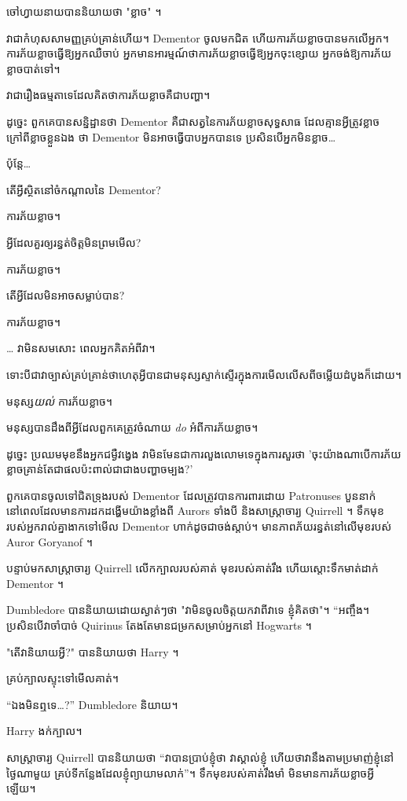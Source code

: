 {ចៅហ្វាយនាយបាននិយាយថា "ខ្លាច" ។

វាជាកំហុសសាមញ្ញគ្រប់គ្រាន់ហើយ។ Dementor ចូលមកជិត ហើយការភ័យខ្លាចបានមកលើអ្នក។ ការភ័យខ្លាចធ្វើឱ្យអ្នកឈឺចាប់ អ្នកមានអារម្មណ៍ថាការភ័យខ្លាចធ្វើឱ្យអ្នកចុះខ្សោយ អ្នកចង់ឱ្យការភ័យខ្លាចបាត់ទៅ។

វាជារឿងធម្មតាទេដែលគិតថាការភ័យខ្លាចគឺជាបញ្ហា។

ដូច្នេះ ពួកគេបានសន្និដ្ឋានថា Dementor គឺជាសត្វនៃការភ័យខ្លាចសុទ្ធសាធ ដែលគ្មានអ្វីត្រូវខ្លាច ក្រៅពីខ្លាចខ្លួនឯង ថា Dementor មិនអាចធ្វើបាបអ្នកបានទេ ប្រសិនបើអ្នកមិនខ្លាច…

ប៉ុន្តែ…

\begin{em}
តើអ្វីស្ថិតនៅចំកណ្តាលនៃ Dementor?

ការភ័យខ្លាច។

អ្វី​ដែល​គួរ​ឲ្យ​រន្ធត់​ចិត្ត​មិន​ព្រម​មើល?

ការភ័យខ្លាច។

តើអ្វីដែលមិនអាចសម្លាប់បាន?

ការភ័យខ្លាច។
\end{em}

… វា​មិន​សម​សោះ ពេល​អ្នក​គិត​អំពី​វា។

ទោះបីជាវាច្បាស់គ្រប់គ្រាន់ថាហេតុអ្វីបានជាមនុស្សស្ទាក់ស្ទើរក្នុងការមើលលើសពីចម្លើយដំបូងក៏ដោយ។

មនុស្ស\emph{យល់} ការភ័យខ្លាច។

មនុស្សបានដឹងពីអ្វីដែលពួកគេត្រូវចំណាយ \emph{do} អំពីការភ័យខ្លាច។

ដូច្នេះ ប្រឈមមុខនឹងអ្នកជម្ងឺវង្វេង វាមិនមែនជាការលួងលោមទេក្នុងការសួរថា 'ចុះយ៉ាងណាបើការភ័យខ្លាចគ្រាន់តែជាផលប៉ះពាល់ជាជាងបញ្ហាចម្បង?'

ពួកគេបានចូលទៅជិតទ្រុងរបស់ Dementor ដែលត្រូវបានការពារដោយ Patronuses បួននាក់ នៅពេលដែលមានការដកដង្ហើមយ៉ាងខ្លាំងពី Aurors ទាំងបី និងសាស្រ្តាចារ្យ Quirrell ។ ទឹក​មុខ​របស់​អ្នក​រាល់​គ្នា​ងាក​ទៅ​មើល​ Dementor ហាក់​ដូច​ជា​ចង់​ស្តាប់។ មានភាពភ័យរន្ធត់នៅលើមុខរបស់ Auror Goryanof ។

បន្ទាប់មកសាស្រ្តាចារ្យ Quirrell លើកក្បាលរបស់គាត់ មុខរបស់គាត់រឹង ហើយស្ដោះទឹកមាត់ដាក់ Dementor ។

Dumbledore បាននិយាយដោយស្ងាត់ៗថា "វាមិនចូលចិត្តយកវាពីវាទេ ខ្ញុំគិតថា"។ “អញ្ចឹង។ ប្រសិនបើវាចាំបាច់ Quirinus តែងតែមានជម្រកសម្រាប់អ្នកនៅ Hogwarts ។

"តើវានិយាយអ្វី?" បាននិយាយថា Harry ។

គ្រប់​ក្បាល​ស្ទុះ​ទៅ​មើល​គាត់។

“ឯងមិនឮទេ…?” Dumbledore និយាយ។

Harry ងក់ក្បាល។

សាស្ត្រាចារ្យ Quirrell បាននិយាយថា “វាបានប្រាប់ខ្ញុំថា វាស្គាល់ខ្ញុំ ហើយថាវានឹងតាមប្រមាញ់ខ្ញុំនៅថ្ងៃណាមួយ គ្រប់ទីកន្លែងដែលខ្ញុំព្យាយាមលាក់”។ ទឹក​មុខ​របស់​គាត់​រឹង​មាំ មិន​មាន​ការ​ភ័យ​ខ្លាច​អ្វី​ឡើយ។

}
